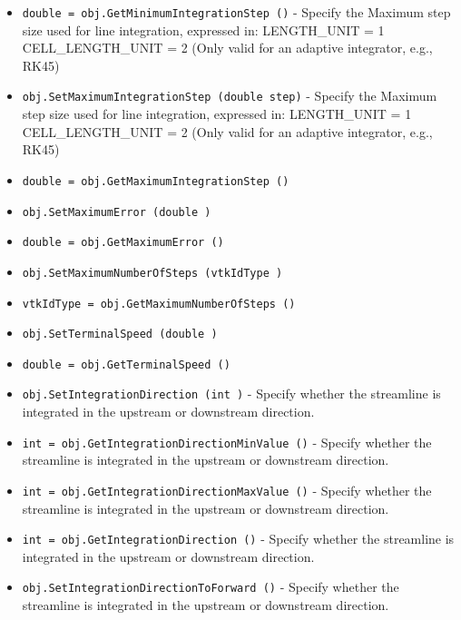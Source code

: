 \begin{itemize}
\item  \verb|double = obj.GetMinimumIntegrationStep ()| -  Specify the Maximum step size used for line integration, expressed in:
 LENGTH\_UNIT      = 1
 CELL\_LENGTH\_UNIT = 2
 (Only valid for an adaptive integrator, e.g., RK45)

\item  \verb|obj.SetMaximumIntegrationStep (double step)| -  Specify the Maximum step size used for line integration, expressed in:
 LENGTH\_UNIT      = 1
 CELL\_LENGTH\_UNIT = 2
 (Only valid for an adaptive integrator, e.g., RK45)

\item  \verb|double = obj.GetMaximumIntegrationStep ()|

\item  \verb|obj.SetMaximumError (double )|

\item  \verb|double = obj.GetMaximumError ()|

\item  \verb|obj.SetMaximumNumberOfSteps (vtkIdType )|

\item  \verb|vtkIdType = obj.GetMaximumNumberOfSteps ()|

\item  \verb|obj.SetTerminalSpeed (double )|

\item  \verb|double = obj.GetTerminalSpeed ()|

\item  \verb|obj.SetIntegrationDirection (int )| -  Specify whether the streamline is integrated in the upstream or
 downstream direction.

\item  \verb|int = obj.GetIntegrationDirectionMinValue ()| -  Specify whether the streamline is integrated in the upstream or
 downstream direction.

\item  \verb|int = obj.GetIntegrationDirectionMaxValue ()| -  Specify whether the streamline is integrated in the upstream or
 downstream direction.

\item  \verb|int = obj.GetIntegrationDirection ()| -  Specify whether the streamline is integrated in the upstream or
 downstream direction.

\item  \verb|obj.SetIntegrationDirectionToForward ()| -  Specify whether the streamline is integrated in the upstream or
 downstream direction.


\end{itemize}
